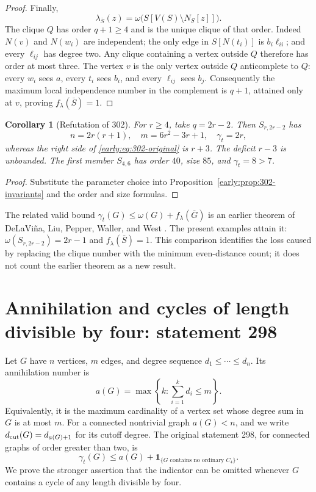 \documentclass[11pt,a4paper]{article}
\newtheorem{corollary}[theorem]{Corollary}
\theoremstyle{definition}\newtheorem{definition}[theorem]{Definition}
\theoremstyle{remark}\newtheorem{remark}[theorem]{Remark}
\begin{document}
\begin{proof}
Finally,
\[
 \lambda_{\overline S}(z)
   =\omega\bigl(S[V(S)\setminus N_S[z]]\bigr).
\]
The clique $Q$ has order $q+1\geq4$ and is the unique clique of
that order.  Indeed $N(v)$ and $N(w_i)$ are independent; the only
edge in $S[N(t_i)]$ is $b_i\ell_{ii}$; and every $\ell_{ij}$ has
degree two.  Any clique containing a vertex outside $Q$ therefore
has order at most three.  The vertex $v$ is the only vertex outside
$Q$ anticomplete to $Q$: every $w_i$ sees $a$, every $t_i$ sees
$b_i$, and every $\ell_{ij}$ sees $b_j$.  Consequently the maximum
local independence number in the complement is $q+1$, attained
only at $v$, proving $f_\lambda(\overline S)=1$.
\end{proof}

\begin{corollary}[Refutation of 302]
\label{early:cor:302}
For $r\geq4$, take $q=2r-2$.  Then $S_{r,2r-2}$ has
\[
 n=2r(r+1),\quad m=6r^2-3r+1,\quad
 \gamma_t=2r,
\]
whereas the right side of \eqref{early:eq:302-original} is $r+3$.
The deficit $r-3$ is unbounded.  The first member $S_{4,6}$ has
order $40$, size $85$, and $\gamma_t=8>7$.
\end{corollary}
\begin{proof}
Substitute the parameter choice into
Proposition~\ref{early:prop:302-invariants} and the order and size formulas.
\end{proof}

The related valid bound
$\gamma_t(G)\leq\omega(G)+f_\lambda(\overline G)$ is an earlier
theorem of DeLaVi\~na, Liu, Pepper, Waller, and West
\cite[Theorem~10]{early:dlpww-total}.  The present examples attain it:
$\omega(S_{r,2r-2})=2r-1$ and $f_\lambda(\overline S)=1$.
This comparison identifies the loss caused by replacing the clique
number with the minimum even-distance count; it does not count the
earlier theorem as a new result.

\section{Annihilation and cycles of length divisible by four: statement 298}
\label{early:sec:298}

Let $G$ have $n$ vertices, $m$ edges, and degree sequence
$d_1\leq\cdots\leq d_n$.  Its annihilation number is
\[
 a(G)=\max\left\{k:\sum_{i=1}^k d_i\leq m\right\}.
\]
Equivalently, it is the maximum cardinality of a vertex set whose
degree sum in $G$ is at most $m$.  For a connected nontrivial graph
$a(G)<n$, and we write $d_{\rm cut}(G)=d_{a(G)+1}$ for its cutoff
degree.  The original statement 298, for connected graphs of order
greater than two, is
\begin{equation}
 \gamma_t(G)\leq a(G)+
 \mathbf1_{\{G\text{ contains no ordinary }C_4\}}.
 \label{early:eq:298-original}
\end{equation}
We prove the stronger assertion that the indicator can be omitted
whenever $G$ contains a cycle of any length divisible by four.
\end{document}
